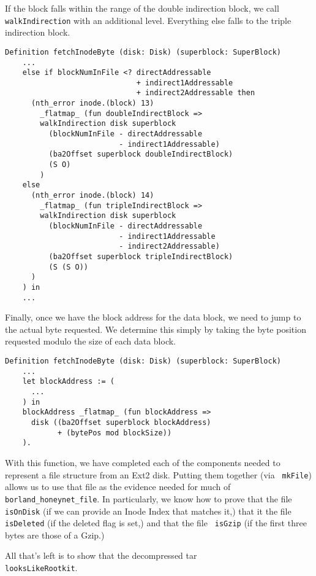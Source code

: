 \documentclass[nocopyrightspace]{sigplanconf}
\begin{document}
If the block falls within the range of the double indirection block, we call
{\tt walkIndirection} with an additional level. Everything else falls to the
triple indirection block.

\begin{lstlisting}
Definition fetchInodeByte (disk: Disk) (superblock: SuperBlock)
    ...
    else if blockNumInFile <? directAddressable
                              + indirect1Addressable
                              + indirect2Addressable then
      (nth_error inode.(block) 13) 
        _flatmap_ (fun doubleIndirectBlock =>
        walkIndirection disk superblock 
          (blockNumInFile - directAddressable
                          - indirect1Addressable)
          (ba2Offset superblock doubleIndirectBlock)
          (S O)
        )
    else 
      (nth_error inode.(block) 14) 
        _flatmap_ (fun tripleIndirectBlock =>
        walkIndirection disk superblock 
          (blockNumInFile - directAddressable
                          - indirect1Addressable
                          - indirect2Addressable)
          (ba2Offset superblock tripleIndirectBlock) 
          (S (S O))
      )
    ) in
    ...
\end{lstlisting}

Finally, once we have the block address for the data block, we need to jump to
the actual byte requested. We determine this simply by taking the byte
position requested modulo the size of each data block.

\begin{lstlisting}
Definition fetchInodeByte (disk: Disk) (superblock: SuperBlock)
    ...
    let blockAddress := (
      ...
    ) in
    blockAddress _flatmap_ (fun blockAddress =>
      disk ((ba2Offset superblock blockAddress) 
            + (bytePos mod blockSize))
    ).
\end{lstlisting}

With this function, we have completed each of the components needed to
represent a file structure from an Ext2 disk. Putting them together (via {\tt
mkFile}) allows us to use that file as the evidence needed for much of {\tt
borland\_honeynet\_file}. In particularly, we know how to prove that the file
{\tt isOnDisk} (if we can provide an Inode Index that matches it,) that it the
file {\tt isDeleted} (if the deleted flag is set,) and that the file {\tt
isGzip} (if the first three bytes are those of a Gzip.)

All that's left is to show that the decompressed tar \\
{\tt looksLikeRootkit}.
\end{document}
